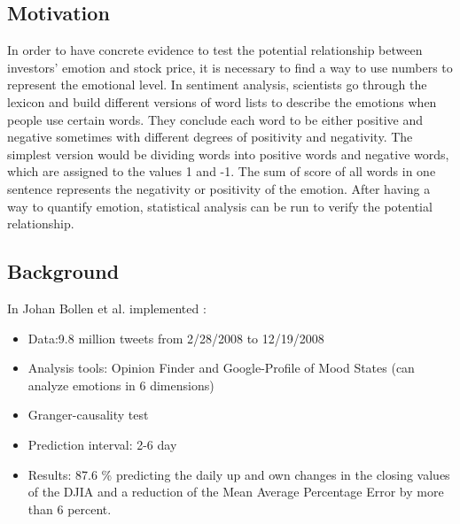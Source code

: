 \documentclass[a0,landscape]{a0poster}\usepackage[]{graphicx}\usepackage[]{color}
\begin{document}
\begin{multicols}{4}
\subsection*{Motivation}

In order to have concrete evidence to test the potential relationship between investors' emotion and stock price, it is necessary to find a way to use numbers to represent the emotional level. In sentiment analysis, scientists go through the lexicon and build different versions of word lists to describe the emotions when people use certain words. They conclude each word to be either positive and negative sometimes with different degrees of positivity and negativity. The simplest version would be dividing words into positive words and negative words, which are assigned to the values 1 and -1. The sum of score of all words in one sentence represents the negativity or positivity of the emotion. After having a way to quantify emotion, statistical analysis can be run to verify the potential relationship. 

\subsection*{Background}

In \cite{bollen2011twitter} Johan Bollen et al. implemented :
\begin{itemize}
\item Data:9.8 million tweets from 2/28/2008 to 12/19/2008
\item Analysis tools: Opinion Finder and Google-Profile of Mood States (can analyze emotions in 6 dimensions) 
\item Granger-causality test
\item Prediction interval: 2-6 day
\item Results: 87.6 \% predicting the daily up and own changes in the closing values of the DJIA and a reduction of the Mean Average Percentage Error by more than 6 percent.
\end{itemize}




\end{multicols}
\end{document}
